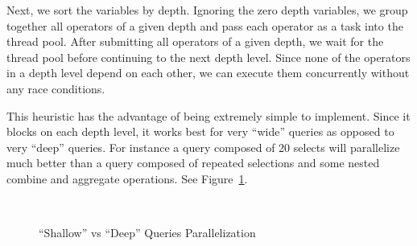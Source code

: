 \documentclass[a4paper, 12pt]{article}
\begin{document}
\medskip
Next, we sort the variables by depth. Ignoring the zero depth variables, we group together all operators of a given depth and  pass each operator as a task into the thread pool. After submitting all operators of a given depth, we wait for the thread pool before continuing to the next depth level. Since none of the operators in a depth level depend on each other, we can execute them concurrently without any race conditions. 

\medskip
This heuristic has the advantage of being extremely simple to implement. Since it blocks on each depth level, it works best for very ``wide'' queries as opposed to very ``deep'' queries. For instance a query composed of 20 selects will parallelize much better than a query composed of repeated selections and some nested combine and aggregate operations. See Figure~\ref{fig:shallow}.

 \begin{figure}[ht]
     \begin{center}
        ~%
        \caption{``Shallow'' vs ``Deep'' Queries Parallelization}
        \label{fig:shallow}
     \end{center}
 \end{figure}
      
\end{document}
